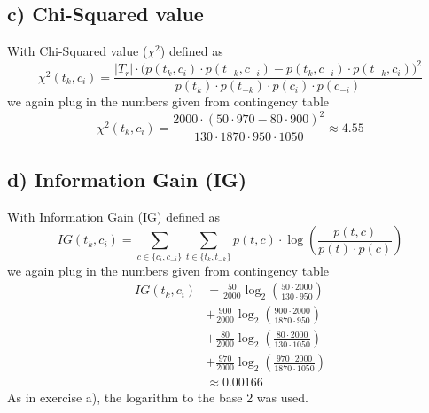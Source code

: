\documentclass[11pt]{article}
\begin{document}
\subsection*{c) Chi-Squared value}
With Chi-Squared value ($\chi^2$) defined as
\begin{equation}
	\chi^2(t_k, c_i) = \frac{|T_r| \cdot \big( p(t_k, c_i) \cdot p(t_{-k}, c_{-i}) -
						 p(t_{k}, c_{-i}) \cdot p(t_{-k}, c_{i}) \big)^2}
						 {p(t_k) \cdot p(t_{-k}) \cdot p(c_{i}) \cdot p(c_{-i})}
\end{equation}
we again plug in the numbers given from contingency table
\begin{equation}
	\chi^2(t_k, c_i) = \frac{2000 \cdot (50 \cdot 970 - 80 \cdot 900)^2}
					{130 \cdot 1870 \cdot 950 \cdot 1050} 
					\approx 4.55
\end{equation}
\subsection*{d) Information Gain (IG)}
With Information Gain (IG) defined as
\begin{equation}
	IG(t_k, c_i) = \sum_{c \in \{c_i, c_{-i}\}}  \sum_{t \in \{t_k, t_{-k}\}} p(t,c) 
				 \cdot \log \left( \frac{p(t,c)}{p(t) \cdot p(c)} \right)
\end{equation}
we again plug in the numbers given from contingency table
\begin{align*}
	IG(t_k, c_i) &= \frac{50}{2000} \log_2 \left( \frac{50 \cdot 2000}{130 \cdot 950} \right) \\
				 &+ \frac{900}{2000} \log_2 \left( \frac{900 \cdot 2000}{1870 \cdot 950} \right) \\
				 &+ \frac{80}{2000} \log_2 \left( \frac{80 \cdot 2000}{130 \cdot 1050} \right) \\
				 &+ \frac{970}{2000} \log_2 \left( \frac{970 \cdot 2000}{1870 \cdot 1050} \right) \\
				 &\approx 0.00166
\end{align*}
As in exercise a), the logarithm to the base 2 was used.
\end{document}
